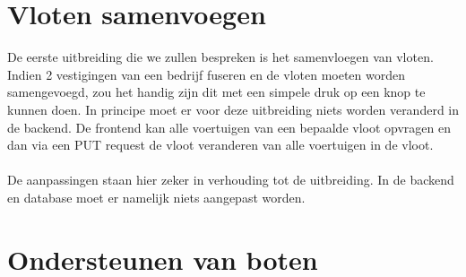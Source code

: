 \documentclass{article}
\begin{document}

\section{Vloten samenvoegen}

De eerste uitbreiding die we zullen bespreken is het samenvloegen van vloten. Indien 2 vestigingen van een bedrijf fuseren en de vloten moeten worden samengevoegd, zou het handig zijn dit met een simpele druk op een knop te kunnen doen. In principe moet er voor deze uitbreiding niets worden veranderd in de backend. De frontend kan alle voertuigen van een bepaalde vloot opvragen en dan via een PUT request de vloot veranderen van alle voertuigen in de vloot.
\\
\\
De aanpassingen staan hier zeker in verhouding tot de uitbreiding. In de backend en database moet er namelijk niets aangepast worden.

\section{Ondersteunen van boten}
	
\end{document}
